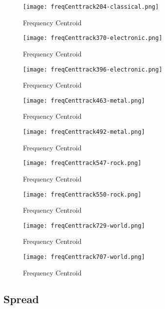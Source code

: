 \documentclass{article} %
\begin{document}
\begin{figure}[H]
\centering
\texttt{[image: freqCenttrack204-classical.png]}
\caption{Frequency Centroid}
\label{fig:centr204}
\end{figure}

\begin{figure}[H]
\centering
\texttt{[image: freqCenttrack370-electronic.png]}
\caption{Frequency Centroid}
\label{fig:cent370}
\end{figure}


\begin{figure}[H]
\centering
\texttt{[image: freqCenttrack396-electronic.png]}
\caption{Frequency Centroid}
\label{fig:cent396}
\end{figure}


\begin{figure}[H]
\centering
\texttt{[image: freqCenttrack463-metal.png]}
\caption{Frequency Centroid}
\label{fig:cent463}
\end{figure}


\begin{figure}[H]
\centering
\texttt{[image: freqCenttrack492-metal.png]}
\caption{Frequency Centroid}
\label{fig:cent492}
\end{figure}


\begin{figure}[H]
\centering
\texttt{[image: freqCenttrack547-rock.png]}
\caption{Frequency Centroid}
\label{fig:cent547}
\end{figure}


\begin{figure}[H]
\centering
\texttt{[image: freqCenttrack550-rock.png]}
\caption{Frequency Centroid}
\label{fig:cent550}
\end{figure}


\begin{figure}[H]
\centering
\texttt{[image: freqCenttrack729-world.png]}
\caption{Frequency Centroid}
\label{fig:cent729}
\end{figure}


\begin{figure}[H]
\centering
\texttt{[image: freqCenttrack707-world.png]}
\caption{Frequency Centroid}
\label{fig:cent707}
\end{figure}



\clearpage
\subsection{Spread}
\label{sec:spread}
\end{document}
